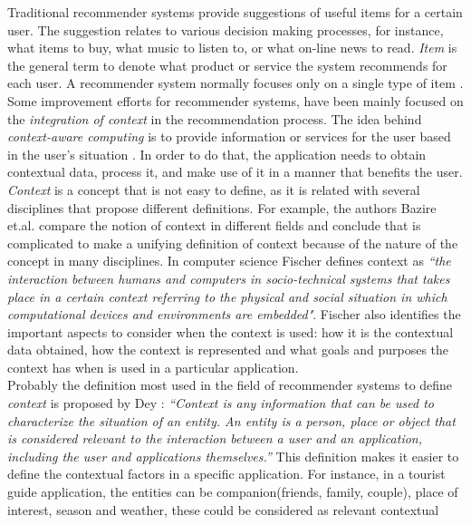Traditional recommender systems provide suggestions of useful items
for a certain user. The suggestion relates to various decision making
processes, for instance, what items to buy, what music to listen to, or
what on-line news to read. \textit{Item} is the general term to denote
what product or service the system recommends for each user. A
recommender system normally focuses only on a single type of item
 \cite{resnick1997recommender}.
Some improvement efforts for recommender systems, have been mainly
focused on the
\textit{integration of context} in the recommendation process. 
The idea behind \textit{context-aware computing} is to provide
information or services for the user based in the user's situation
 \cite{dey2001understanding}. In order to do that, the application 
needs to obtain contextual data, process it, and make use of it 
in a manner that benefits the user. \\ 
\textit{Context} is a concept that is not easy to define, as it is related with
several disciplines that propose different definitions. For example,
the authors Bazire et.al. \cite{bazire2005understanding} compare the
notion of context in different fields and conclude that is complicated to make a
unifying definition of context because of the nature of the concept in
many disciplines. In computer science Fischer \cite{fischer2012context}
defines context as \textit{``the interaction between humans and
computers in socio-technical systems that takes place in a certain
context referring to the physical and social situation in which
computational devices and environments are embedded"}. 
Fischer also identifies
the important aspects to consider when the context is used: how it is
the contextual data obtained, how the context is represented and what
goals and purposes the context has when is used in a particular
application. \\
Probably the definition most used in the field of recommender systems to 
define \textit{context} is proposed by Dey \cite{dey2001understanding}:
\textit{``Context is any information that can be used to characterize
the situation of an entity. An entity is a person, place or object
that is considered relevant to the interaction between a user and an
application, including the user and applications themselves.''}  This
definition makes it easier to define the contextual factors in a
specific application. For instance, in a tourist guide application, the
entities can be companion(friends, family, couple), place of interest,
season and weather, these could be considered as relevant contextual
